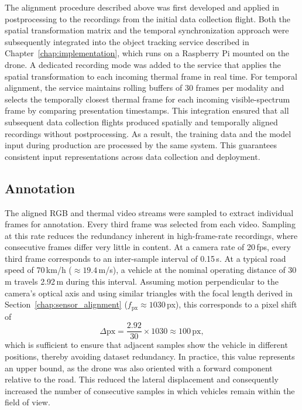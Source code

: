 \documentclass[12pt,oneside,bibtotoc,liststotoc]{scrbook}
\begin{document}
The alignment procedure described above was first developed and applied in
postprocessing to the recordings from the initial data collection flight.
Both the spatial transformation matrix and the temporal synchronization approach
were subsequently integrated into the object tracking service described in
Chapter~\ref{chap:implementation}, which runs on a Raspberry Pi mounted on the drone.
A dedicated recording mode was added to the service that applies the spatial
transformation to each incoming thermal frame in real time.
For temporal alignment, the service maintains rolling buffers of 30 frames per
modality and selects the temporally closest thermal frame for each incoming
visible-spectrum frame by comparing presentation timestamps.
This integration ensured that all subsequent data collection flights produced
spatially and temporally aligned recordings without postprocessing.
As a result, the training data and the model input during production are
processed by the same system.
This guarantees consistent input representations across data collection and deployment.

\vspace{-1em}
\subsection{Annotation}

The aligned RGB and thermal video streams were sampled to extract individual frames for annotation.
Every third frame was selected from each video.
Sampling at this rate reduces the redundancy inherent in high-frame-rate recordings, where consecutive
frames differ very little in content.
At a camera rate of 20\,fps, every third frame corresponds to an inter-sample interval of 0.15\,s.
At a typical road speed of 70\,km/h ($\approx 19.4$\,m/s), a vehicle at the nominal operating
distance of 30\,m travels 2.92\,m during this interval.
Assuming motion perpendicular to the camera's optical axis and using similar triangles with the
focal length derived in Section~\ref{chap:sensor_alignment} ($f_\mathrm{px} \approx 1030$\,px),
this corresponds to a pixel shift of
%
\begin{equation}
    \Delta\mathrm{px} = \frac{2.92}{30} \times 1030 \approx 100\,\mathrm{px},
\end{equation}
%
which is sufficient to ensure that adjacent samples show the vehicle in
different positions, thereby avoiding dataset redundancy.
In practice, this value represents an upper bound, as the drone was also oriented with a forward
component relative to the road. This reduced the lateral displacement
and consequently increased the number of consecutive samples in which vehicles remain within the field of view.
\end{document}
